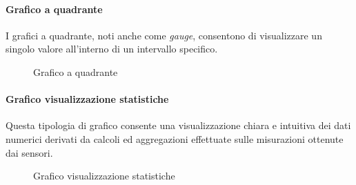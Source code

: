 \paragraph{Grafico a quadrante}
\hypertarget{par:grafico_quadrante}{}
I grafici a quadrante, noti anche come \textit{gauge}, consentono di visualizzare un singolo valore all'interno di un intervallo specifico.

\begin{figure}[H]
    \centering
    \caption{Grafico a quadrante}
    \label{fig:my_label}
\end{figure}


\paragraph{Grafico visualizzazione statistiche}
\hypertarget{par:visu_stat}{}
Questa tipologia di grafico consente una visualizzazione chiara e intuitiva dei dati numerici derivati da calcoli ed aggregazioni effettuate sulle misurazioni ottenute dai sensori.
\begin{figure}[H]
    \centering
    \caption{Grafico visualizzazione statistiche}
    \label{fig:my_label}
\end{figure}


